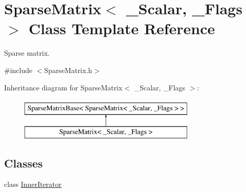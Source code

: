 \hypertarget{class_sparse_matrix}{\section{Sparse\-Matrix$<$ \-\_\-\-Scalar, \-\_\-\-Flags $>$ Class Template Reference}
\label{class_sparse_matrix}
}


Sparse matrix.  




{\ttfamily \#include $<$Sparse\-Matrix.\-h$>$}

Inheritance diagram for Sparse\-Matrix$<$ \-\_\-\-Scalar, \-\_\-\-Flags $>$\-:\begin{figure}[H]
\begin{center}
\leavevmode
\includegraphics[height=2.000000cm]{class_sparse_matrix}
\end{center}
\end{figure}
\subsection*{Classes}
\begin{DoxyCompactItemize}
\item 
class \hyperlink{class_sparse_matrix_1_1_inner_iterator}{Inner\-Iterator}
\end{DoxyCompactItemize}
